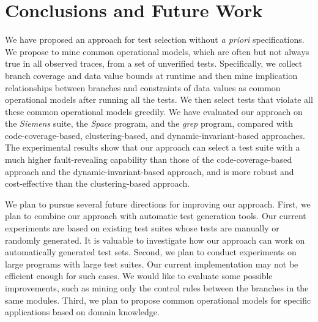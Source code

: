 \documentclass{sig-alternate}
\begin{document}
\section{Conclusions and Future Work}
\label{sec:conclusions}

We have proposed an approach for test selection without \emph{a
priori} specifications. We propose to mine common operational
models, which are often but not always true in all observed traces,
from a set of unverified tests. Specifically, we collect branch
coverage and data value bounds at runtime and then mine implication
relationships between branches and constraints of data values as
common operational models after running all the tests. We then
select tests that violate all these common operational models
greedily. We have evaluated our approach on the \emph{Siemens}
suite, the \emph{Space} program, and the \emph{grep} program,
compared with code-coverage-based, clustering-based, and
dynamic-invariant-based approaches. The experimental results show
that our approach can select a test suite with a much higher
fault-revealing capability than those of the code-coverage-based
approach and the dynamic-invariant-based approach, and is more
robust and cost-effective than the clustering-based approach.

We plan to pursue several future directions for improving our
approach. First, we plan to combine our approach with automatic test
generation tools. Our current experiments are based on existing test
suites whose tests are manually or randomly generated. It is
valuable to investigate how our approach can work on automatically
generated test sets. Second, we plan to conduct experiments on large
programs with large test suites. Our current implementation may not
be efficient enough for such cases. We would like to evaluate some
possible improvements, such as mining only the control rules between
the branches in the same modules. Third, we plan to propose common
operational models for specific applications based on domain
knowledge.







\end{document}
